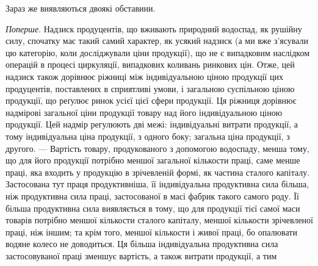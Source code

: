 Зараз же виявляються двоякі обставини.

\emph{Поперше}. Надзиск продуцентів, що вживають природний водоспад, як
рушійну силу, спочатку має такий самий характер, як усякий надзиск (а ми
вже з’ясували цю категорію, коли досліджували ціни продукції), що не є
випадковим наслідком операцій в процесі циркуляції, випадкових коливань ринкових
цін. Отже, цей надзиск також дорівнює ріжниці між індивідуальною ціною продукції
цих продуцентів, поставлених в сприятливі умови, і загальною суспільною ціною
продукції, що реґулює ринок усієї цієї сфери продукції. Ця ріжниця дорівнює
надмірові загальної ціни продукції товару над його індивідуальною ціною продукції.
Цей надмір регулюють дві межі: індивідуальні витрати продукції, а тому
індивідуальна ціна продукції, з одного боку; загальна ціна продукції, з другого. —
Вартість товару, продукованого з допомогою водоспаду, менша тому, що для
його продукції потрібно меншої загальної кількости праці, саме менше праці, яка
входить у продукцію в зрічевленій формі, як частина сталого капіталу. Застосована
тут праця продуктивніша, її індивідуальна продуктивна сила більша,
ніж продуктивна сила праці, застосованої в масі фабрик такого самого роду.
Її більша продуктивна сила виявляється в тому, що для продукції тієї самої
маси товарів потрібно меншої кількости сталого капіталу, меншої кількости
зрічевленої праці, ніж іншим; та крім того, меншої кількости і живої праці,
бо опалювати водяне колесо не доводиться. Ця більша індивідуальна продуктивна
сила застосовуваної праці зменшує вартість, а також витрати продукції, а тим
\parbreak{}  %
